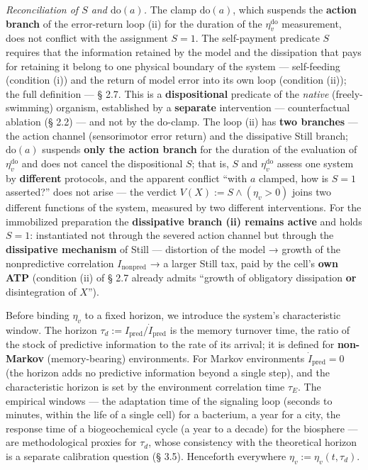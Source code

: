 \documentclass[pdflatex,sn-mathphys-ay]{sn-jnl}
\begin{document}
\emph{Reconciliation of \(S\) and \(\mathrm{do}(a)\).} The clamp \(\mathrm{do}(a)\), which suspends the \textbf{action branch} of the error-return loop (ii) for the duration of the \(\eta_v^{\mathrm{do}}\) measurement, does not conflict with the assignment \(S = 1\). The self-payment predicate \(S\) requires that the information retained by the model and the dissipation that pays for retaining it belong to one physical boundary of the system --- self-feeding (condition (i)) and the return of model error into its own loop (condition (ii)); the full definition --- § 2.7. This is a \textbf{dispositional} predicate of the \emph{native} (freely-swimming) organism, established by a \textbf{separate} intervention --- counterfactual ablation (§ 2.2) --- and not by the do-clamp. The loop (ii) has \textbf{two branches} --- the action channel (sensorimotor error return) and the dissipative Still branch; \(\mathrm{do}(a)\) suspends \textbf{only the action branch} for the duration of the evaluation of \(\eta_v^{\mathrm{do}}\) and does not cancel the dispositional \(S\); that is, \(S\) and \(\eta_v^{\mathrm{do}}\) assess one system by \textbf{different} protocols, and the apparent conflict ``with \(a\) clamped, how is \(S = 1\) asserted?'' does not arise --- the verdict \(V(X) := S \wedge (\eta_v > 0)\) joins two different functions of the system, measured by two different interventions. For the immobilized preparation the \textbf{dissipative branch (ii) remains active} and holds \(S = 1\): instantiated not through the severed action channel but through the \textbf{dissipative mechanism} of Still --- distortion of the model → growth of the nonpredictive correlation \(I_{\text{nonpred}}\) → a larger Still tax, paid by the cell's \textbf{own ATP} (condition (ii) of § 2.7 already admits ``growth of obligatory dissipation \textbf{or} disintegration of \(X\)'').

Before binding \(\eta_v\) to a fixed horizon, we introduce the system's characteristic window. The horizon \(\tau_d := I_{\text{pred}}/\dot I_{\text{pred}}\) is the memory turnover time, the ratio of the stock of predictive information to the rate of its arrival; it is defined for \textbf{non-Markov} (memory-bearing) environments. For Markov environments \(\dot I_{\text{pred}} = 0\) (the horizon adds no predictive information beyond a single step), and the characteristic horizon is set by the environment correlation time \(\tau_E\). The empirical windows --- the adaptation time of the signaling loop (seconds to minutes, within the life of a single cell) for a bacterium, a year for a city, the response time of a biogeochemical cycle (a year to a decade) for the biosphere --- are methodological proxies for \(\tau_d\), whose consistency with the theoretical horizon is a separate calibration question (§ 3.5). Henceforth everywhere \(\eta_v := \eta_v(t, \tau_d)\).
\end{document}
